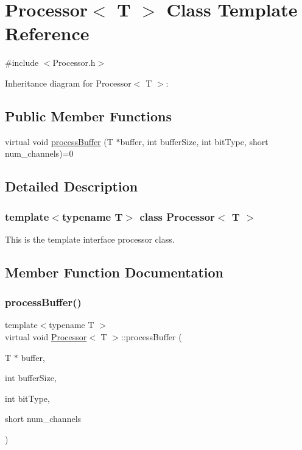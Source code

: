 \hypertarget{classProcessor}{}\section{Processor$<$ T $>$ Class Template Reference}
\label{classProcessor}


{\ttfamily \#include $<$Processor.\+h$>$}



Inheritance diagram for Processor$<$ T $>$\+:
\subsection*{Public Member Functions}
\begin{DoxyCompactItemize}
\item 
virtual void \hyperlink{classProcessor_a48316eb3ee1863621b4f89ae23fc110c}{process\+Buffer} (T $\ast$buffer, int buffer\+Size, int bit\+Type, short num\+\_\+channels)=0
\end{DoxyCompactItemize}


\subsection{Detailed Description}
\subsubsection*{template$<$typename T$>$\newline
class Processor$<$ T $>$}

This is the template interface processor class. 

\subsection{Member Function Documentation}
\mbox{\label{classProcessor_a48316eb3ee1863621b4f89ae23fc110c}} 
\subsubsection{\texorpdfstring{process\+Buffer()}{processBuffer()}}
{\footnotesize\ttfamily template$<$typename T $>$ \\
virtual void \hyperlink{classProcessor}{Processor}$<$ T $>$\+::process\+Buffer (\begin{DoxyParamCaption}\item[{T $\ast$}]{buffer,  }\item[{int}]{buffer\+Size,  }\item[{int}]{bit\+Type,  }\item[{short}]{num\+\_\+channels }\end{DoxyParamCaption})\hspace{0.3cm}{\ttfamily [pure virtual]}}


